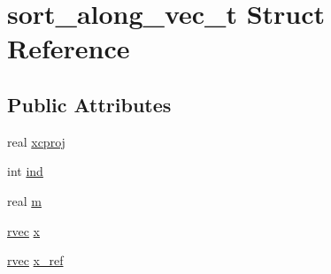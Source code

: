 \hypertarget{structsort__along__vec__t}{\section{sort\-\_\-along\-\_\-vec\-\_\-t \-Struct \-Reference}
\label{structsort__along__vec__t}
}
\subsection*{\-Public \-Attributes}
\begin{DoxyCompactItemize}
\item 
real \hyperlink{structsort__along__vec__t_a03348aff3d15b29fdc76a34ec5f9ea5e}{xcproj}
\item 
int \hyperlink{structsort__along__vec__t_acc2114a84371fd229441cb872946c2d9}{ind}
\item 
real \hyperlink{structsort__along__vec__t_aecb90bf8817b54c915a447f80d929425}{m}
\item 
\hyperlink{share_2template_2gromacs_2types_2simple_8h_aa02a552a4abd2f180c282a083dc3a999}{rvec} \hyperlink{structsort__along__vec__t_af435d3f46bbd4fd8c3726389e71f27e5}{x}
\item 
\hyperlink{share_2template_2gromacs_2types_2simple_8h_aa02a552a4abd2f180c282a083dc3a999}{rvec} \hyperlink{structsort__along__vec__t_a238bbc07e5a38f9c0229d404ab5a32ee}{x\-\_\-ref}
\end{DoxyCompactItemize}


